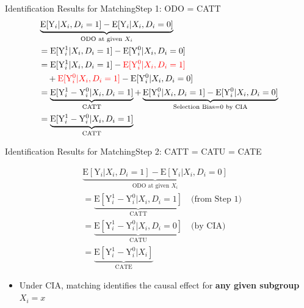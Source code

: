 \documentclass[dvipsnames,hyperref={pdfpagelabels=false}]{beamer}
\begin{document}

\begin{frame}{Identification Results for Matching}{Step 1: ODO = CATT}
{\small
\begin{equation*}
\begin{aligned}
& 
\underbrace{\mathrm{E}[\mathrm{Y}_{i}|X_{i},D_{i}=1] - \mathrm{E}[\mathrm{Y}_{i}|X_{i},D_{i}=0]}_{\text{ODO at given } X_{i}}  \\
&=\mathrm{E}[\mathrm{Y}^{1}_{i}|X_{i},D_{i}=1] - \mathrm{E}[\mathrm{Y}^{0}_{i}|X_{i},D_{i}=0] \\
&= \mathrm{E}[\mathrm{Y}^{1}_{i}|X_{i},D_i=1]
-{\color{red} \mathrm{E}[\mathrm{Y}^{0}_{i}|X_{i},D_i=1]} \\
&\quad + {\color{red} \mathrm{E}[\mathrm{Y}^{0}_{i}|X_{i},D_i=1]}
-\mathrm{E}[\mathrm{Y}^{0}_{i}|X_{i},D_i=0] \\
&= \underbrace{\mathrm{E}[\mathrm{Y}^{1}_{i}-\mathrm{Y}^{0}_{i}|X_{i},D_i=1]}_{\text{CATT}} 
+ \underbrace{\mathrm{E}[\mathrm{Y}^{0}_{i}|X_{i},D_i=1]-\mathrm{E}[\mathrm{Y}^{0}_{i}|X_{i},D_i=0]}_{\scriptstyle\text{Selection Bias} = 0 \text{ by CIA}}  \\
&= \underbrace{\mathrm{E}[\mathrm{Y}^{1}_{i}-\mathrm{Y}^{0}_{i}|X_{i},D_i=1]}_{\text{CATT}}
\end{aligned}
\end{equation*}
}
\end{frame}



\begin{frame}{Identification Results for Matching}{Step 2: CATT = CATU = CATE}

	\begin{equation*}
		\begin{aligned}
		& 
			\underbrace{\mathrm{E}[\mathrm{Y}_{i}|X_{i},D_{i}=1] - \mathrm{E}[\mathrm{Y}_{i}|X_{i},D_{i}=0]}_{\text{ODO at given } X_{i}}  \\
			&= \underbrace{\mathrm{E}[\mathrm{Y}^{1}_{i}-\mathrm{Y}^{0}_{i}|X_{i},D_i=1]}_{\text{CATT}} \quad \text{(from Step 1)} \\[6pt]
			&= \underbrace{\mathrm{E}[\mathrm{Y}^{1}_{i}-\mathrm{Y}^{0}_{i}|X_{i},D_i=0]}_{\text{CATU}} \quad \text{(by CIA)} \\[6pt]
			&= \underbrace{\mathrm{E}[\mathrm{Y}^{1}_{i}-\mathrm{Y}^{0}_{i}|X_{i}]}_{\text{CATE}}
		\end{aligned}
	\end{equation*}	
	\begin{itemize}
		\item Under CIA, matching identifies the causal effect for \textbf{any given subgroup} $X_i = x$
	\end{itemize}
	
\end{frame}
\end{document}
